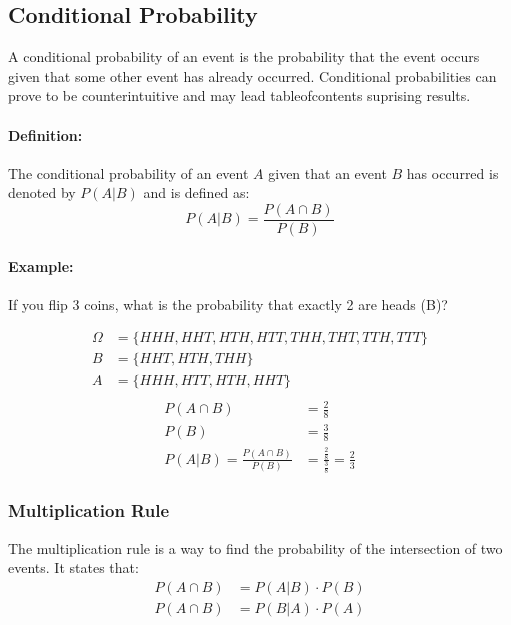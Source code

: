 \subsection{Conditional Probability}
\hrulefill

A conditional probability of an event is the probability that the event occurs given that some other event
has already occurred. Conditional probabilities can prove to be counterintuitive and may lead tableofcontents
suprising results.

\paragraph*{Definition:} The conditional probability of an event $A$ given that an event $B$ has occurred is denoted by
$P(A|B)$ and is defined as:
\[
    P(A|B) = \frac{P(A \cap B)}{P(B)}
\]

\paragraph*{Example:} If you flip 3 coins, what is the probability that exactly 2 are heads (B)?

\begin{align*}
    \Omega &= \{HHH, HHT, HTH, HTT, THH, THT, TTH, TTT\} \\
    B &= \{HHT, HTH, THH\} \\
    A &= \{HHH, HTT, HTH, HHT\} \\
\end{align*}
\begin{align*}
    P(A \cap B) &= \frac{2}{8} \\
    P(B) &= \frac{3}{8} \\
    P(A|B) = \frac{P(A \cap B)}{P(B)} &= \frac{\frac{2}{8}}{\frac{3}{8}} = \frac{2}{3}
\end{align*}

\subsubsection*{Multiplication Rule}
The multiplication rule is a way to find the probability of the intersection of two events. It states that:
\begin{align*}
    P(A \cap B) &= P(A|B) \cdot P(B) \\
    P(A \cap B) &= P(B|A) \cdot P(A) \\
\end{align*}

\pagebreak

